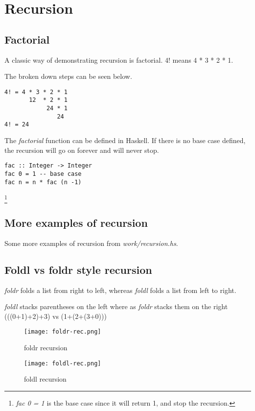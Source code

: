 \section{Recursion}

\subsection{Factorial}
A classic way of demonstrating recursion is factorial. 4! means
4 * 3 * 2 * 1.

The broken down steps can be seen below.

\begin{verbatim}
4! = 4 * 3 * 2 * 1
       12  * 2 * 1
            24 * 1
               24
4! = 24
\end{verbatim}

The \emph{factorial} function can be defined in Haskell.
If there is no base case defined, the recursion will go on forever and will never stop.

\begin{lstlisting}
fac :: Integer -> Integer
fac 0 = 1 -- base case
fac n = n * fac (n -1)
\end{lstlisting}

\footnote{\emph{fac 0 = 1} is the base case since it will return 1, and stop the recursion.}

\subsection{More examples of recursion}
Some more examples of recursion from \emph{work/recursion.hs}.



\newpage
\subsection{Foldl vs foldr style recursion}
\emph{foldr} folds a list from right to left, whereas \emph{foldl} folds
a list from left to right.

\emph{foldl} stacks parentheses on the left where as \emph{foldr} stacks them on the right
(((0+1)+2)+3) vs (1+(2+(3+0)))

\begin{figure}[h]
\texttt{[image: foldr-rec.png]}
\centering
\caption{foldr recursion}
\end{figure}

\begin{figure}[h]
\texttt{[image: foldl-rec.png]}
\centering
\caption{foldl recursion}
\end
{figure}